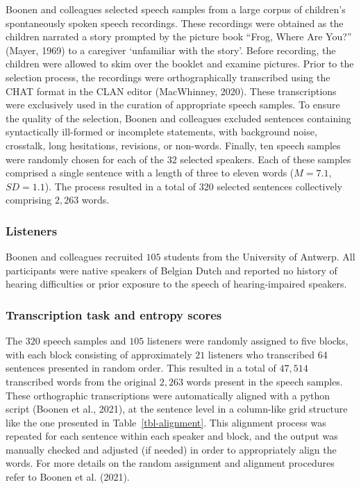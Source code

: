 \documentclass[
]{agujournal2019}
\begin{document}
Boonen and colleagues selected speech samples from a large corpus of
children's spontaneously spoken speech recordings. These recordings were
obtained as the children narrated a story prompted by the picture book
``Frog, Where Are You?'' (Mayer, 1969) to a caregiver `unfamiliar with
the story'. Before recording, the children were allowed to skim over the
booklet and examine pictures. Prior to the selection process, the
recordings were orthographically transcribed using the CHAT format in
the CLAN editor (MacWhinney, 2020). These transcriptions were
exclusively used in the curation of appropriate speech samples. To
ensure the quality of the selection, Boonen and colleagues excluded
sentences containing syntactically ill-formed or incomplete statements,
with background noise, crosstalk, long hesitations, revisions, or
non-words. Finally, ten speech samples were randomly chosen for each of
the \(32\) selected speakers. Each of these samples comprised a single
sentence with a length of three to eleven words (\(M=7.1\), \(SD=1.1\)).
The process resulted in a total of \(320\) selected sentences
collectively comprising \(2,263\) words.

\subsubsection{Listeners}\label{sec-M-L}

Boonen and colleagues recruited \(105\) students from the University of
Antwerp. All participants were native speakers of Belgian Dutch and
reported no history of hearing difficulties or prior exposure to the
speech of hearing-impaired speakers.

\subsubsection{Transcription task and entropy scores}\label{sec-M-TS}

The \(320\) speech samples and \(105\) listeners were randomly assigned
to five blocks, with each block consisting of approximately \(21\)
listeners who transcribed \(64\) sentences presented in random order.
This resulted in a total of \(47,514\) transcribed words from the
original \(2,263\) words present in the speech samples. These
orthographic transcriptions were automatically aligned with a python
script (Boonen et al., 2021), at the sentence level in a column-like
grid structure like the one presented in Table~\ref{tbl-alignment}. This
alignment process was repeated for each sentence within each speaker and
block, and the output was manually checked and adjusted (if needed) in
order to appropriately align the words. For more details on the random
assignment and alignment procedures refer to Boonen et al. (2021).
\end{document}
